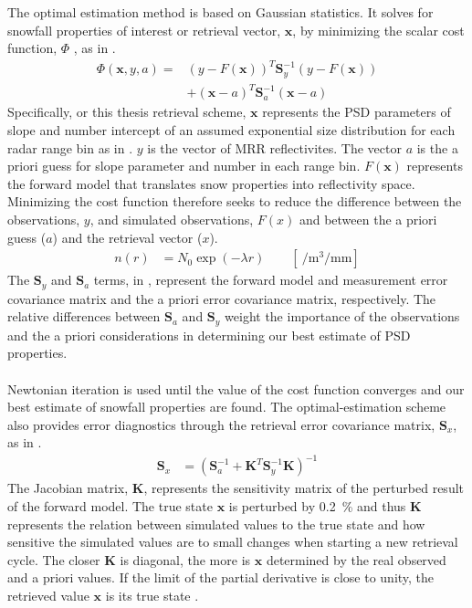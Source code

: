 \\
\\
The optimal estimation method is based on Gaussian statistics.  It solves for snowfall properties of interest or retrieval vector, $\mathbf{x}$, by minimizing the scalar cost function, $\Phi$ , as in .
\begin{equation}
\begin{split}
\Phi(\mathbf{x},y,a) = & (y- F(\mathbf{x}))^T \mathbf{S}_y^{-1} 			(y-F(\mathbf{x})) \\
&+(\mathbf{x}-a)^T \mathbf{S}_{a}^{-1} (\mathbf{x}-a)
\end{split} \label{eq:scalar_cost_fct}
\end{equation}
Specifically, or this thesis retrieval scheme, $\mathbf{x}$ represents the PSD parameters of slope and number intercept of an assumed exponential size distribution for each radar range bin as in . $y$ is the vector of MRR reflectivites. The vector $a$ is the a priori guess for slope parameter and number in each range bin. $F(\mathbf{x})$ represents the forward model that translates snow properties into reflectivity space.  Minimizing the cost function therefore seeks to reduce the difference between the observations, $y$, and simulated observations, $F(x)$ and between the a priori guess ($a$) and the retrieval vector ($x$).
\begin{align}
	n(r) & = N_{0} \exp\left(-\lambda r\right) \qquad [ \SI{}{\per\cubic\metre\per\mm} ] \label{eq:num_dens}
\end{align}
The $\mathbf{S}_y$ and $\mathbf{S}_{a}$ terms, in , represent the forward model and measurement error covariance matrix and the a priori error covariance matrix, respectively. The relative differences between $\mathbf{S}_{a}$ and $\mathbf{S}_y$ weight the importance of the observations and the a priori considerations in determining our best estimate of PSD properties. 
\\
\\
Newtonian iteration is used until the value of the cost function converges and our best estimate of snowfall properties are found.  The optimal-estimation scheme also provides error diagnostics through the retrieval error covariance matrix, $\mathbf{S}_x$, as in .
\begin{align}
	\mathbf{S}_x & = \left( \mathbf{S}_a^{-1} + \mathbf{K}^T \mathbf{S}_y^{-1} \mathbf{K} \right)^{-1}\label{eq:Sx}
\end{align}
The Jacobian matrix, $\mathbf{K}$, represents the sensitivity matrix of the perturbed result of the forward model. The true state $\mathbf{x}$ is perturbed by \SI{0.2}{\percent} and thus $\mathbf{K}$ represents the relation between simulated values to the true state and how sensitive the simulated values are to small changes when starting a new retrieval cycle. The closer $\mathbf{K}$ is diagonal, the more is $\mathbf{x}$ determined by the real observed and a priori values. If the limit of the partial derivative is close to unity, the retrieved value $\mathbf{x}$ is its true state \citep{wood_estimation_2011}.
